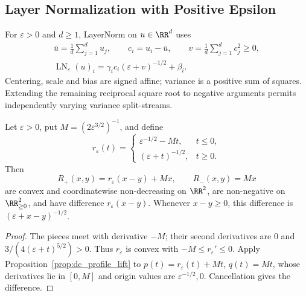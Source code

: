 \subsection{Layer Normalization with Positive Epsilon}

For $\varepsilon>0$ and $d\ge1$, LayerNorm on $u\in\RR^d$ uses
\begin{equation}
\begin{gathered}
    \bar u=\frac1d\sum_{j=1}^d u_j,\qquad c_i=u_i-\bar u,
    \qquad v=\frac1d\sum_{j=1}^d c_j^2\ge0,\\
    \operatorname{LN}_{\varepsilon}(u)_i
    =\gamma_i c_i(\varepsilon+v)^{-1/2}+\beta_i.
\end{gathered}
    \label{eq:layernorm_dc_definition}
\end{equation}
Centering, scale and bias are signed affine; variance is a positive sum of squares. Extending the remaining reciprocal square root to negative arguments permits independently varying variance split-streams.

\begin{proposition}\label{prop:reciprocal_sqrt_pair}
Let $\varepsilon>0$, put $M=(2\varepsilon^{3/2})^{-1}$, and define
\begin{equation}
    r_{\varepsilon}(t)=
    \begin{cases}
        \varepsilon^{-1/2}-Mt,&t\le0,\\
        (\varepsilon+t)^{-1/2},&t\ge0.
    \end{cases}
    \label{eq:reciprocal_sqrt_extension}
\end{equation}
Then
\begin{equation}
    R_+(x,y)=r_{\varepsilon}(x-y)+Mx,
    \qquad R_-(x,y)=Mx
    \label{eq:reciprocal_sqrt_pair}
\end{equation}
are convex and coordinatewise non-decreasing on $\RR^2$, are non-negative on $\RR^2_{\ge0}$, and have difference $r_{\varepsilon}(x-y)$. Whenever $x-y\ge0$, this difference is $(\varepsilon+x-y)^{-1/2}$.
\end{proposition}

\begin{proof}
The pieces meet with derivative $-M$; their second derivatives are $0$ and $3/(4(\varepsilon+t)^{5/2})>0$. Thus $r_\varepsilon$ is convex with $-M\le r_\varepsilon'\le0$. Apply Proposition~\ref{prop:dc_profile_lift} to $p(t)=r_\varepsilon(t)+Mt$, $q(t)=Mt$, whose derivatives lie in $[0,M]$ and origin values are $\varepsilon^{-1/2},0$. Cancellation gives the difference.
\end{proof}

